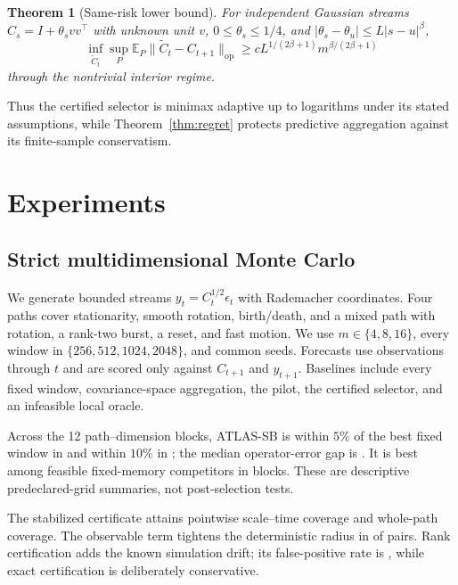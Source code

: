 \documentclass{article}
\newtheorem{theorem}{Theorem}
\theoremstyle{definition}
\theoremstyle{remark}
\newcommand{\E}{\mathbb E}
\newcommand{\op}{\mathrm{op}}
\begin{document}
\begin{theorem}[Same-risk lower bound]
\label{thm:lower}
For independent Gaussian streams $C_s=I+\theta_svv^\top$ with unknown unit $v$, $0\le\theta_s\le1/4$, and $|\theta_s-\theta_u|\le L|s-u|^\beta$,
\begin{equation}
 \inf_{\widetilde C_t}\sup_P\E_P\|\widetilde C_t-C_{t+1}\|_{\op}
 \ge cL^{1/(2\beta+1)}m^{\beta/(2\beta+1)}
 \label{eq:lower-rate}
\end{equation}
through the nontrivial interior regime.
\end{theorem}

Thus the certified selector is minimax adaptive up to logarithms under its stated assumptions, while Theorem~\ref{thm:regret} protects predictive aggregation against its finite-sample conservatism.

\section{Experiments}
\label{sec:experiments}

\subsection{Strict multidimensional Monte Carlo}

We generate bounded streams $y_t=C_t^{1/2}\epsilon_t$ with Rademacher coordinates.  Four paths cover stationarity, smooth rotation, birth/death, and a mixed path with rotation, a rank-two burst, a reset, and fast motion.  We use $m\in\{4,8,16\}$, every window in $\{256,512,1024,2048\}$, and common seeds.  Forecasts use observations through $t$ and are scored only against $C_{t+1}$ and $y_{t+1}$.  Baselines include every fixed window, covariance-space aggregation, the pilot, the certified selector, and an infeasible local oracle.



Across the 12 path--dimension blocks, ATLAS-SB is within $5\%$ of the best fixed window in \MCWithinFive and within $10\%$ in \MCWithinTen; the median operator-error gap is \MCMedianGap.  It is best among feasible fixed-memory competitors in \MCBestBlocks blocks.  These are descriptive predeclared-grid summaries, not post-selection tests.



The stabilized certificate attains \MCPointCoverage pointwise scale--time coverage and \MCPathCoverage whole-path coverage.  The observable term tightens the deterministic radius in \MCTightening of pairs.  Rank certification adds the known simulation drift; its false-positive rate is \MCRankFPR, while exact certification is deliberately conservative.
\end{document}
